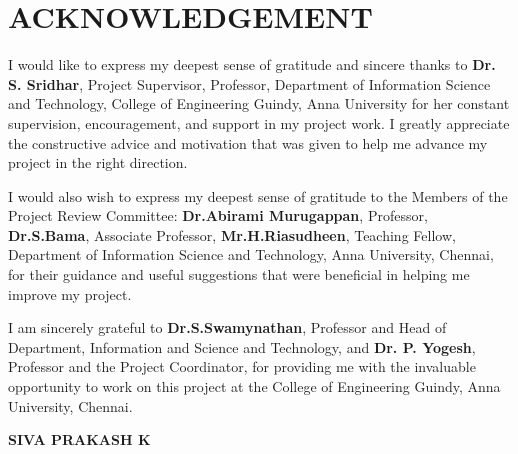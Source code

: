 \chapter*{\uppercase{ACKNOWLEDGEMENT}}
I would like to express my deepest sense of gratitude and sincere thanks to \textbf{Dr. S. Sridhar}, Project Supervisor, Professor, Department of Information Science and Technology, College of Engineering Guindy, Anna University for her constant supervision, encouragement, and support in my project work. I greatly appreciate the constructive advice and motivation that was given to help me advance my project in the right direction. 

I would also wish to express my deepest sense of gratitude to the Members of the Project Review Committee: \textbf{Dr.Abirami Murugappan}, Professor, \textbf{Dr.S.Bama}, Associate Professor, \textbf{Mr.H.Riasudheen}, Teaching Fellow, Department of Information Science and Technology, Anna University, Chennai, for their guidance and useful suggestions that were beneficial in helping me improve my project.

I am sincerely grateful to \textbf{Dr.S.Swamynathan}, Professor and Head of Department, Information and Science and Technology, and \textbf{Dr. P. Yogesh}, Professor and the Project Coordinator, for providing me with the invaluable opportunity to work on this project at the College of Engineering Guindy, Anna University, Chennai.

\textbf{SIVA PRAKASH K}